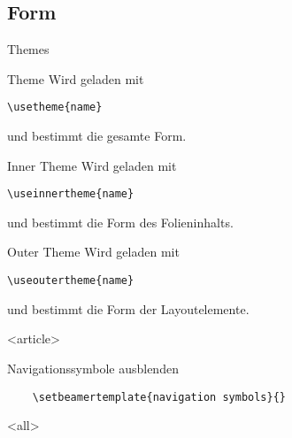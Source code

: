 
\subsection{Form}

\begin{Frame}[fragile]{Themes}
  \begin{Block}{Theme}
    Wird geladen mit
    \begin{lstlisting}[gobble=6,style=block]
      \usetheme{name}
    \end{lstlisting}
    und bestimmt die \alert{gesamte Form}.
  \end{Block}

  \begin{Block}{Inner Theme}
    Wird geladen mit
    \begin{lstlisting}[gobble=6,style=block]
      \useinnertheme{name}
    \end{lstlisting}
    und bestimmt die \alert{Form des Folieninhalts}.
  \end{Block}

  \begin{Block}{Outer Theme}
    Wird geladen mit
    \begin{lstlisting}[gobble=6,style=block]
      \useoutertheme{name}
    \end{lstlisting}
    und bestimmt die \alert{Form der Layoutelemente}.
  \end{Block}
\end{Frame}


\mode
<article>

\begin{Block}{Navigationssymbole ausblenden}
  \begin{lstlisting}[gobble=4]
    % hide navigation symbols
    \setbeamertemplate{navigation symbols}{}
  \end{lstlisting}
\end{Block}

\mode
<all>

